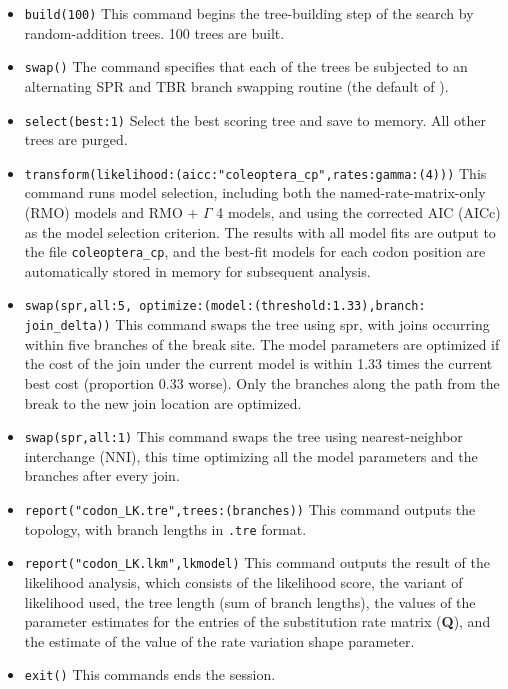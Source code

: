 \begin{itemize}
\item \texttt{build(100)} This command begins the tree-building step of the search by random-addition trees. 100 trees 
are built.
\item \texttt{swap()} The  command specifies that each of the trees be subjected to an 
alternating SPR and TBR branch swapping routine (the default of \poy).
\item \texttt{select(best:1)} Select the best scoring tree and save to memory. All other trees are purged.
\item \texttt{transform(likelihood:(aicc:"coleoptera\_cp",rates:gamma:(4)))} This command runs model selection, including both
the named-rate-matrix-only (RMO) models and RMO + $\Gamma$ 4 models, and using the corrected AIC (AICc) as the model selection 
criterion. The results with all model fits are output to the file \texttt{coleoptera\_cp}, and the best-fit models for each codon 
position are automatically stored in memory for subsequent analysis.
\item \texttt{swap(spr,all:5, optimize:(model:(threshold:1.33),branch: \\ join\_delta))} This command swaps the tree using 
spr, with joins occurring within five branches of the break site. The model parameters are
optimized if the cost of the join under the current model is within 1.33 times the current best cost (proportion 0.33 worse). 
Only the branches along the path from the break to the new join location are optimized. 
\item \texttt{swap(spr,all:1)} This command swaps the tree using nearest-neighbor interchange (NNI), this time
optimizing all the model parameters and the branches after every join.
\item \texttt{report("codon\_LK.tre",trees:(branches))} This command outputs the topology, with branch lengths in 
\texttt{.tre} format.
\item \texttt{report("codon\_LK.lkm",lkmodel)} This command outputs the result of the likelihood analysis, which 
consists of the likelihood score, the variant of likelihood used, the tree length (sum of branch lengths), the values 
of the parameter estimates for the entries of the substitution rate matrix (\textbf{Q}), and the estimate of the value of 
the rate variation shape parameter.
\item \texttt{exit()} This commands ends the \poy session.
\end{itemize}

